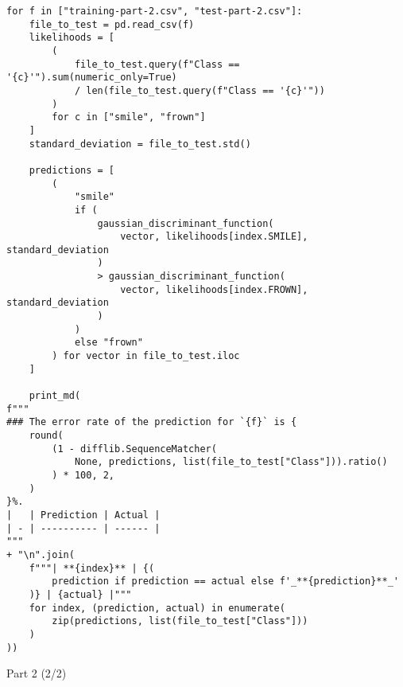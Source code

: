 \documentclass[12pt,a4paper]{article}
\begin{document}
\begin{listing}[h]
\begin{verbatim}
for f in ["training-part-2.csv", "test-part-2.csv"]:
    file_to_test = pd.read_csv(f)
    likelihoods = [
        (
            file_to_test.query(f"Class == '{c}'").sum(numeric_only=True)
            / len(file_to_test.query(f"Class == '{c}'"))
        )
        for c in ["smile", "frown"]
    ]
    standard_deviation = file_to_test.std()

    predictions = [
        (
            "smile"
            if (
                gaussian_discriminant_function(
                    vector, likelihoods[index.SMILE], standard_deviation
                )
                > gaussian_discriminant_function(
                    vector, likelihoods[index.FROWN], standard_deviation
                )
            )
            else "frown"
        ) for vector in file_to_test.iloc
    ]

    print_md(
f"""
### The error rate of the prediction for `{f}` is {
    round(
        (1 - difflib.SequenceMatcher(
            None, predictions, list(file_to_test["Class"])).ratio()
        ) * 100, 2,
    )
}%.
|   | Prediction | Actual |
| - | ---------- | ------ |
"""
+ "\n".join(
    f"""| **{index}** | {(
        prediction if prediction == actual else f'_**{prediction}**_'
    )} | {actual} |"""
    for index, (prediction, actual) in enumerate(
        zip(predictions, list(file_to_test["Class"]))
    )
))
\end{verbatim}
\caption{Part 2 (2/2)}
\end{listing}
\end{document}
